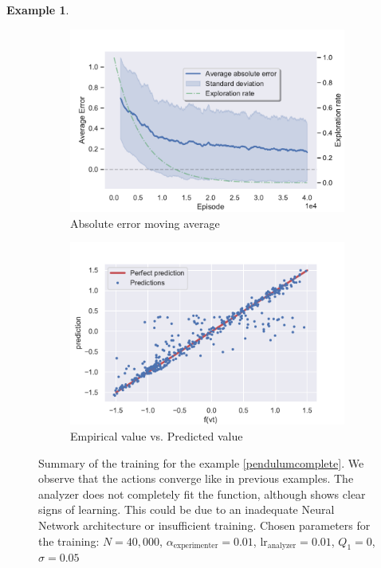 \documentclass[11pt,a4paper,twoside]{report}
\newcommand{\+}{\textnormal{+} }
\theoremstyle{definition}
\newtheorem{myex}[mythm]{Example}
\numberwithin{equation}{chapter}
\begin{document}
\begin{myex}
\begin{figure}
      \bigskip  %
      \begin{subfigure}{0.45\textwidth}
      \includegraphics[width=\linewidth]{figures/Error-MAB5.pdf}
      \caption{Absolute error moving average}
      \end{subfigure}
      \hfill %
      \begin{subfigure}{0.45\textwidth}
      \includegraphics[width=\linewidth]{figures/predictions5.pdf}
      \caption{Empirical value vs. Predicted value}
      \end{subfigure}
      \caption{Summary of the training for the example 
      \ref{pendulumcomplete}. We observe that the actions 
      converge like in previous examples. The analyzer does not 
      completely fit the function, although shows clear signs of 
      learning. This could be due to an inadequate Neural Network
      architecture or insufficient training. Chosen parameters for the training:
      $N=40,000$,
      $\alpha_\text{experimenter}=0.01$, $\text{lr}_\text{analyzer}=0.01$,
      $Q_1=0$, $\sigma=0.05$}
      \label{fig:completepd}
    \end{figure}
  \end{myex}
\end{document}
